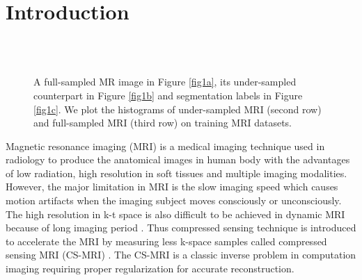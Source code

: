 \documentclass[runningheads]{llncs}
\begin{document}
\section{Introduction}
\label{Intro}

\begin{figure}[htb!]
\begin{center}
   \\
   \\
   \caption{A full-sampled MR image in Figure \ref{fig1a}, its under-sampled counterpart in Figure \ref{fig1b} and segmentation labels in Figure \ref{fig1c}. We plot the histograms of under-sampled MRI (second row) and full-sampled MRI (third row) on training MRI datasets.}
\label{fig1}
\end{center}
\end{figure}

Magnetic resonance imaging (MRI) is a medical imaging technique used in radiology to produce the anatomical images in human body with the advantages of low radiation, high resolution in soft tissues and multiple imaging modalities. However, the major limitation in MRI is the slow imaging speed which causes motion artifacts \cite{1} when the imaging subject moves consciously or unconsciously. The high resolution in k-t space is also difficult to be achieved in dynamic MRI because of long imaging period \cite{2}. Thus compressed sensing technique is introduced to accelerate the MRI by measuring less k-space samples called compressed sensing MRI (CS-MRI) \cite{3}. The CS-MRI is a classic inverse problem in computation imaging requiring proper regularization for accurate reconstruction.
\end{document}
